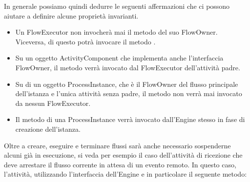 

In generale possiamo quindi dedurre le seguenti affermazioni che ci possono
aiutare a definire alcune proprietà invarianti.

\begin{itemize}
  \item Un FlowExecutor non invocherà mai il metodo  del suo
  FlowOwner. Viceversa, di questo potrà invocare il metodo
  .
  
  \item Su un oggetto ActivityComponent che implementa anche l'interfaccia
  FlowOwner, il metodo  verrà invocato dal FlowExecutor
  dell'attività padre.
  
  \item Su di un oggetto ProcessInstance, che \`e il FlowOwner del flusso
  principale dell'istanza e l'unica attività senza padre, 
  il metodo  non verrà mai invocato da nessun FlowExecutor.
  
  \item Il metodo  di una ProcessInstance verrà invocato
  dall'Engine stesso in fase di creazione dell'istanza.
  
\end{itemize}

Oltre a creare, eseguire e terminare flussi sarà anche necessario sospenderne
alcuni già in esecuzione, si veda per esempio il caso dell'attività di ricezione
che deve arrestare il flusso corrente in attesa di un evento remoto. In questo
caso, l'attività, utilizzando l'interfaccia dell'Engine e in particolare il
seguente metodo:

